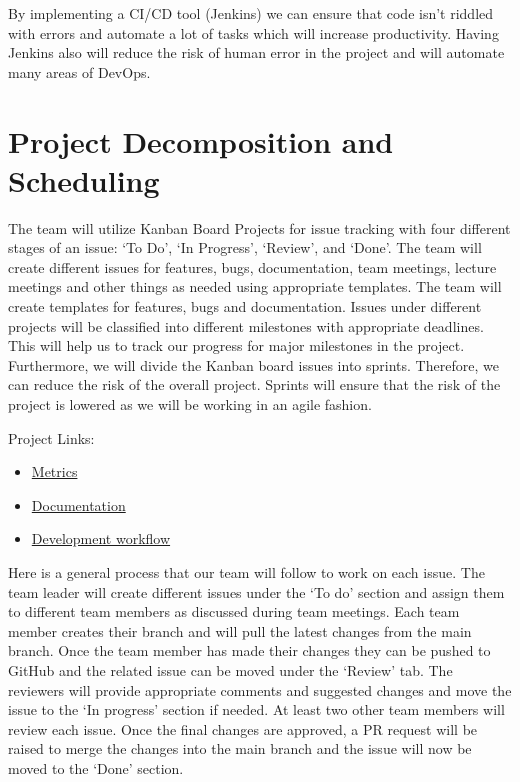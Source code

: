 \documentclass{article}
\begin{document}
By implementing a CI/CD tool (Jenkins) we can ensure that code isn't riddled with errors and automate a lot of tasks which will increase productivity. Having Jenkins also will reduce the risk of human error in the project and will automate many areas of DevOps.

\section{Project Decomposition and Scheduling}

The team will utilize Kanban Board Projects for issue tracking with four different stages of an issue: ‘To Do’, ‘In Progress’, ‘Review’, and ‘Done’. The team will create different issues for features, bugs, documentation, team meetings, lecture meetings and other things as needed using appropriate templates. The team will create templates for features, bugs and documentation. Issues under different projects will be classified into different milestones with appropriate deadlines. This will help us to track our progress for major milestones in the project. Furthermore, we will divide the Kanban board issues into sprints. Therefore, we can reduce the risk of the overall project. Sprints will ensure that the risk of the project is lowered as we will be working in an agile fashion.

Project Links:
\begin{itemize}
\item  
\href{https://github.com/users/Inreet-Kaur/projects/4}{Metrics}
\item  
\href{https://github.com/users/Inreet-Kaur/projects/2}{Documentation} 
\item 
\href{https://github.com/users/Inreet-Kaur/projects/6}{Development workflow}
\end{itemize}

Here is a general process that our team will follow to work on each issue. The team leader will create different issues under the ‘To do’ section and assign them to different team members as discussed during team meetings. Each team member creates their branch and will pull the latest changes from the main branch. Once the team member has made their changes they can be pushed to GitHub and the related issue can be moved under the ‘Review’ tab. The reviewers will provide appropriate comments and suggested changes and move the issue to the ‘In progress’ section if needed. At least two other team members will review each issue. Once the final changes are approved, a PR request will be raised to merge the changes into the main branch and the issue will now be moved to the ‘Done’ section. 
\end{document}
